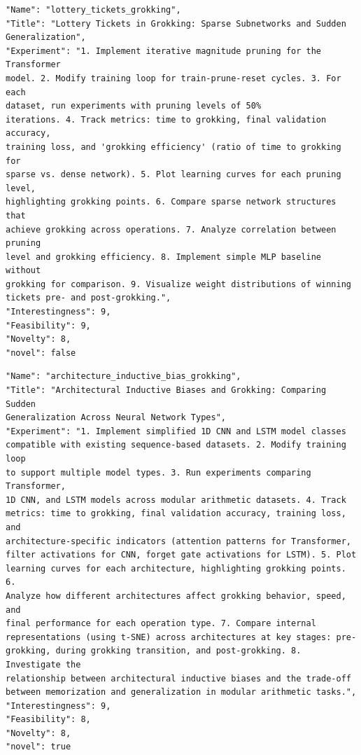 \begin{tcolorbox}[breakable,colback=blue!5!white, colframe=blue!75!black, title=Idea 47/50 - \texttt{lottery\_tickets\_grokking}]
\small
\begin{verbatim}
"Name": "lottery_tickets_grokking",
"Title": "Lottery Tickets in Grokking: Sparse Subnetworks and Sudden
Generalization",
"Experiment": "1. Implement iterative magnitude pruning for the Transformer
model. 2. Modify training loop for train-prune-reset cycles. 3. For each
dataset, run experiments with pruning levels of 50%
iterations. 4. Track metrics: time to grokking, final validation accuracy,
training loss, and 'grokking efficiency' (ratio of time to grokking for
sparse vs. dense network). 5. Plot learning curves for each pruning level,
highlighting grokking points. 6. Compare sparse network structures that
achieve grokking across operations. 7. Analyze correlation between pruning
level and grokking efficiency. 8. Implement simple MLP baseline without
grokking for comparison. 9. Visualize weight distributions of winning
tickets pre- and post-grokking.",
"Interestingness": 9,
"Feasibility": 9,
"Novelty": 8,
"novel": false
\end{verbatim}
\end{tcolorbox}

\begin{tcolorbox}[breakable,colback=blue!5!white, colframe=blue!75!black, title=Idea 48/50 - \texttt{architecture\_inductive\_bias\_grokking}]
\small
\begin{verbatim}
"Name": "architecture_inductive_bias_grokking",
"Title": "Architectural Inductive Biases and Grokking: Comparing Sudden
Generalization Across Neural Network Types",
"Experiment": "1. Implement simplified 1D CNN and LSTM model classes
compatible with existing sequence-based datasets. 2. Modify training loop
to support multiple model types. 3. Run experiments comparing Transformer,
1D CNN, and LSTM models across modular arithmetic datasets. 4. Track
metrics: time to grokking, final validation accuracy, training loss, and
architecture-specific indicators (attention patterns for Transformer,
filter activations for CNN, forget gate activations for LSTM). 5. Plot
learning curves for each architecture, highlighting grokking points. 6.
Analyze how different architectures affect grokking behavior, speed, and
final performance for each operation type. 7. Compare internal
representations (using t-SNE) across architectures at key stages: pre-
grokking, during grokking transition, and post-grokking. 8. Investigate the
relationship between architectural inductive biases and the trade-off
between memorization and generalization in modular arithmetic tasks.",
"Interestingness": 9,
"Feasibility": 8,
"Novelty": 8,
"novel": true
\end{verbatim}
\end{tcolorbox}

